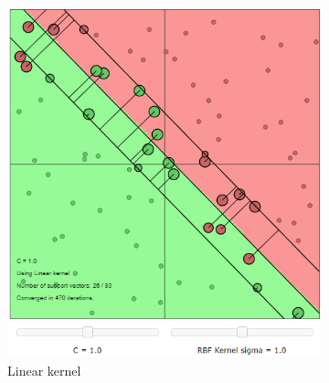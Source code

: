 \documentclass{article}
\begin{document}
        \begin{figure}[h]
             \centering
             \hspace{0.15\textwidth}
             \begin{subfigure}[b]{0.3\textwidth}
                 \centering
                 \includegraphics[width=\textwidth]{Assignment 1/figures/linear_vs_rbf_1.png}
                 \caption{Linear kernel}
                 \label{fig:linear_kernel_vs_rbf_1}
             \end{subfigure}
             \hfill
             \begin{subfigure}[b]{0.3\textwidth}
                 \centering

\end{subfigure}
\end{figure}
\end{document}
